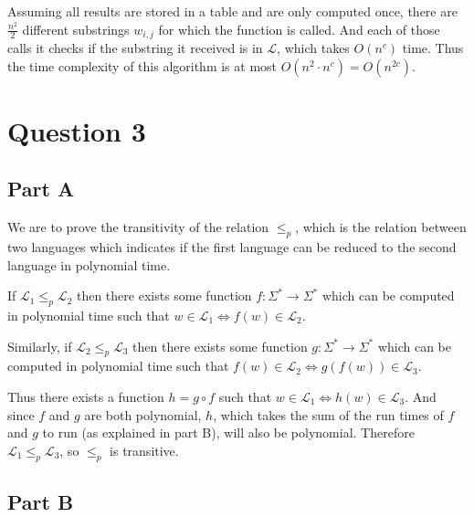 \documentclass{article}
\newcommand{\lang}{\mathcal{L}}
\begin{document}
Assuming all results are stored in a table and are only computed once, there are \(\frac{n^2}{2}\) different substrings \(w_{i,j}\) for which the function is called. And each of those calls it checks if the substring it received is in \(\lang\), which takes \(O(n^c)\) time. Thus the time complexity of this algorithm is at most \(O(n^2 \cdot n^c) = O(n^{2c})\).

\section*{Question 3}

\subsection*{Part A}

We are to prove the transitivity of the relation \(\leq_p\), which is the relation between two languages which indicates if the first language can be reduced to the second language in polynomial time.

If \(\lang_1 \leq_p \lang_2\) then there exists some function \(f: \Sigma^* \to \Sigma^*\) which can be computed in polynomial time such that \(w \in \lang_1 \Leftrightarrow f(w) \in \lang_2\).

Similarly, if \(\lang_2 \leq_p \lang_3\) then there exists some function \(g: \Sigma^* \to \Sigma^*\) which can be computed in polynomial time such that \(f(w) \in \lang_2 \Leftrightarrow g(f(w)) \in \lang_3\).

Thus there exists a function \(h = g \circ f\) such that \(w \in \lang_1 \Leftrightarrow h(w) \in \lang_3\). And since \(f\) and \(g\) are both polynomial, \(h\), which takes the sum of the run times of \(f\) and \(g\) to run (as explained in part B), will also be polynomial. Therefore \(\lang_1 \leq_p \lang_3\), so \(\le_p\) is transitive.

\subsection*{Part B}
\end{document}
